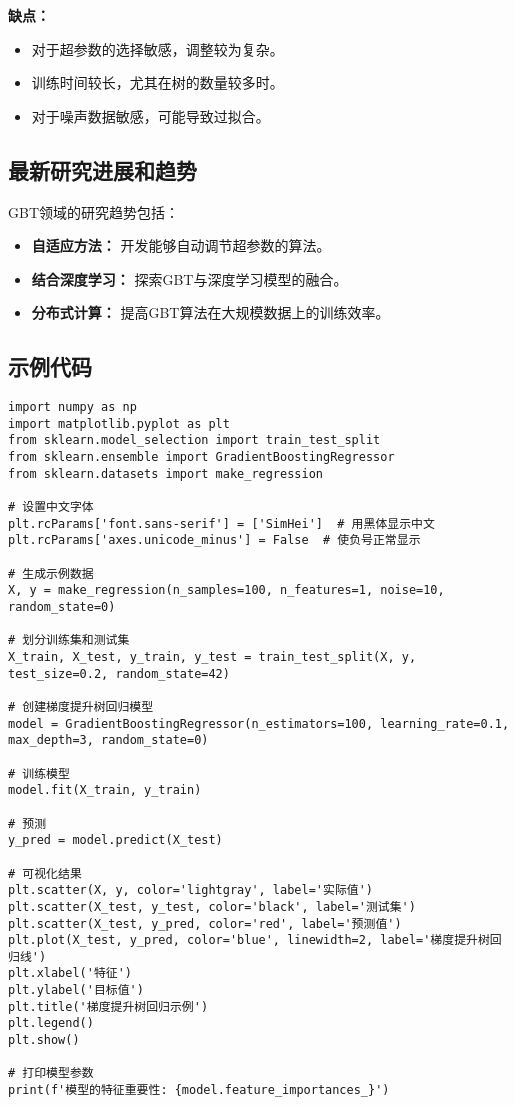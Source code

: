 \textbf{缺点：}
\begin{itemize}
    \item 对于超参数的选择敏感，调整较为复杂。
    \item 训练时间较长，尤其在树的数量较多时。
    \item 对于噪声数据敏感，可能导致过拟合。
\end{itemize}

\subsection*{最新研究进展和趋势}
GBT领域的研究趋势包括：
\begin{itemize}
    \item \textbf{自适应方法：} 开发能够自动调节超参数的算法。
    \item \textbf{结合深度学习：} 探索GBT与深度学习模型的融合。
    \item \textbf{分布式计算：} 提高GBT算法在大规模数据上的训练效率。
\end{itemize}

\subsection{示例代码}

\begin{lstlisting}
import numpy as np
import matplotlib.pyplot as plt
from sklearn.model_selection import train_test_split
from sklearn.ensemble import GradientBoostingRegressor
from sklearn.datasets import make_regression

# 设置中文字体
plt.rcParams['font.sans-serif'] = ['SimHei']  # 用黑体显示中文
plt.rcParams['axes.unicode_minus'] = False  # 使负号正常显示

# 生成示例数据
X, y = make_regression(n_samples=100, n_features=1, noise=10, random_state=0)

# 划分训练集和测试集
X_train, X_test, y_train, y_test = train_test_split(X, y, test_size=0.2, random_state=42)

# 创建梯度提升树回归模型
model = GradientBoostingRegressor(n_estimators=100, learning_rate=0.1, max_depth=3, random_state=0)

# 训练模型
model.fit(X_train, y_train)

# 预测
y_pred = model.predict(X_test)

# 可视化结果
plt.scatter(X, y, color='lightgray', label='实际值')
plt.scatter(X_test, y_test, color='black', label='测试集')
plt.scatter(X_test, y_pred, color='red', label='预测值')
plt.plot(X_test, y_pred, color='blue', linewidth=2, label='梯度提升树回归线')
plt.xlabel('特征')
plt.ylabel('目标值')
plt.title('梯度提升树回归示例')
plt.legend()
plt.show()

# 打印模型参数
print(f'模型的特征重要性: {model.feature_importances_}')

\end{lstlisting}

